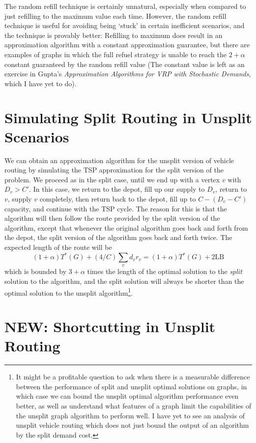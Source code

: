 \documentclass{article}
\theoremstyle{plain}
\theoremstyle{plain}
\begin{document}
The random refill technique is certainly unnatural, especially when compared to just refilling to the maximum value each time. However, the random refill technique is useful for avoiding being `stuck' in certain inefficient scenarios, and the technique is provably better: Refilling to maximum does result in an approximation algorithm with a constant approximation guarantee, but there are examples of graphs in which the full refuel strategy is unable to reach the $2 + \alpha$ constant guaranteed by the random refill value (The constant value is left as an exercise in  Gupta's {\it Approximation Algorithms for VRP with Stochastic Demands}, which I have yet to do).

\section{Simulating Split Routing in Unsplit Scenarios}

We can obtain an approximation algorithm for the unsplit version of vehicle routing by simulating the TSP approximation for the split version of the problem. We proceed as in the split case, until we end up with a vertex $v$ with $D_v > C'$. In this case, we return to the depot, fill up our supply to $D_v$, return to $v$, supply $v$ completely, then return back to the depot, fill up to $C - (D_v - C')$ capacity, and continue with the TSP cycle. The reason for this is that the algorithm will then follow the route provided by the split version of the algorithm, except that whenever the original algorithm goes back and forth from the depot, the split version of the algorithm goes back and forth twice. The expected length of the route will be
%
\[ (1 + \alpha) T^*(G) + (4/C) \sum_v d_v r_v = (1 + \alpha) T^*(G) + 2 \text{LB} \]
%
which is bounded by $3 + \alpha$ times the length of the optimal solution to the {\it split} solution to the algorithm, and the split solution will always be shorter than the optimal solution to the unsplit algorithm\footnote{It might be a profitable question to ask when there is a measurable difference between the performance of split and unsplit optimal solutions on graphs, in which case we can bound the unsplit optimal algorithm performance even better, as well as understand what features of a graph limit the capabilities of the unsplit graph algorithm to perform well. I have yet to see an analysis of unsplit vehicle routing which does not just bound the output of an algorithm by the split demand cost.}.

\section{NEW: Shortcutting in Unsplit Routing}
\end{document}
